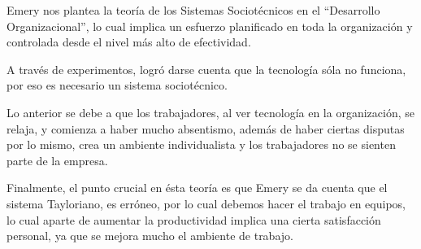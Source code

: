 \begin{itemize}
	Emery nos plantea la teoría de los Sistemas Sociotécnicos
	en el ``Desarrollo Organizacional'',
	lo cual implica un esfuerzo planificado en toda la organización
	y controlada desde el nivel más alto de efectividad.

	A través de experimentos,
	logró darse cuenta que la tecnología sóla no funciona,
	por eso es necesario un sistema sociotécnico.

	Lo anterior se debe a que los trabajadores,
	al ver tecnología en la organización,
	se relaja, y comienza a haber mucho absentismo,
	además de haber ciertas disputas por lo mismo,
	crea un ambiente individualista y los trabajadores
	no se sienten parte de la empresa.

	Finalmente,
	el punto crucial en ésta teoría
	es que Emery se da cuenta que el sistema Tayloriano,
	es erróneo, por lo cual debemos hacer el trabajo
	en equipos, lo cual aparte de aumentar la productividad
	implica una cierta satisfacción personal,
	ya que se mejora mucho el ambiente de trabajo.
	
\end{itemize}
